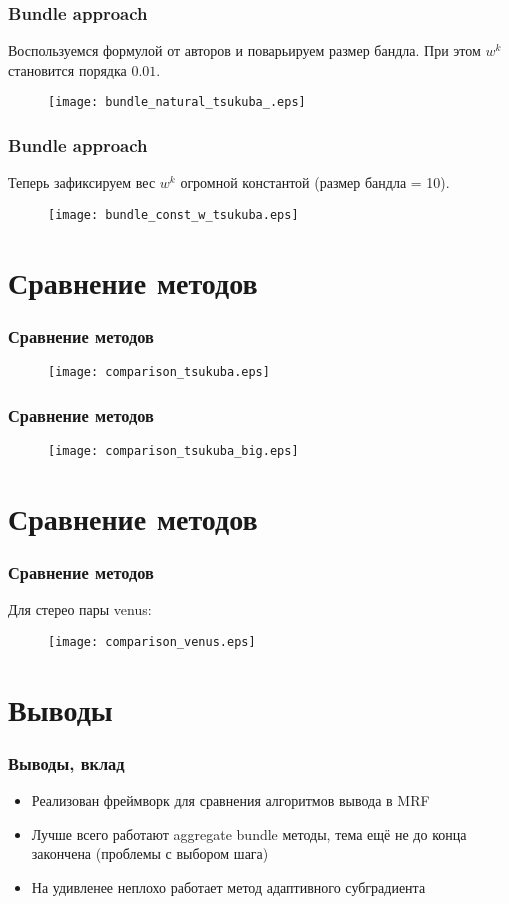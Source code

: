 \documentclass[smaller,unicode,hyperref={unicode=true}]{beamer}
\begin{document}
\begin{frame}
  \frametitle{Bundle approach}
  Воспользуемся формулой от авторов и поварьируем размер бандла. При этом $w^k$ становится порядка $0.01$.
    \begin{figure}
      \texttt{[image: bundle\_natural\_tsukuba\_.eps]}
    \end{figure}
\end{frame}


\begin{frame}
  \frametitle{Bundle approach}
  Теперь зафиксируем вес $w^k$ огромной константой (размер бандла = 10).
    \begin{figure}
      \texttt{[image: bundle\_const\_w\_tsukuba.eps]}
    \end{figure}
\end{frame}

\section{Сравнение методов}
\begin{frame}
  \frametitle{Сравнение методов}
    \begin{figure}
      \texttt{[image: comparison\_tsukuba.eps]}
    \end{figure}
\end{frame}

\begin{frame}
  \frametitle{Сравнение методов}
    \begin{figure}
      \texttt{[image: comparison\_tsukuba\_big.eps]}
    \end{figure}
\end{frame}

\section{Сравнение методов}
\begin{frame}
  \frametitle{Сравнение методов}
    Для стерео пары venus:
    \begin{figure}
      \texttt{[image: comparison\_venus.eps]}
    \end{figure}
\end{frame}

\section{Выводы}
\begin{frame}
  \frametitle{Выводы, вклад}
  \begin{itemize}
    \item Реализован фреймворк для сравнения алгоритмов вывода в MRF
    \item Лучше всего работают aggregate bundle методы, тема ещё не до конца закончена (проблемы с выбором шага)
    \item На удивленее неплохо работает метод адаптивного субградиента
  \end{itemize}
\end{frame}
\end{document}
